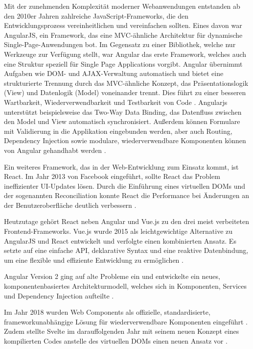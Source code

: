 \documentclass[oneside]{ausarbeitung}
\begin{document}
Mit der zunehmenden Komplexität moderner Webanwendungen entstanden ab den 2010er Jahren zahlreiche JavaScript-Frameworks, die den Entwicklungsprozess vereinheitlichen und vereinfachen sollten. 
Eines davon war AngularJS, ein Framework, das eine \ac{MVC}-ähnliche Architektur für dynamische Single-Page-Anwendungen bot. Im Gegensatz zu einer Bibliothek, welche nur Werkzeuge zur Verfügung stellt, war Angular das erste Framework, welches auch eine Struktur speziell für Single Page Applications vorgibt. Angular übernimmt Aufgaben wie DOM- und \ac{AJAX}-Verwaltung automatisch und bietet eine strukturierte Trennung durch das \ac{MVC}-ähnliche Konzept, das Präsentationslogik (View) und Datenlogik (Model) voneinander trennt. Dies führt zu einer besseren Wartbarkeit, Wiederverwendbarkeit und Testbarkeit von Code \parencite{what-is-angularjs}. Angularjs unterstützt beispielsweise das Two-Way Data Binding, das Datenfluss zwischen den Model und View automatisch synchronisiert. Außerdem können Formulare mit Validierung in die Applikation eingebunden werden, aber auch Routing, Dependency Injection sowie modulare, wiederverwendbare Komponenten können von Angular gehandhabt werden \parencite{angular-history}. 


Ein weiteres Framework, das in der Web-Entwicklung zum Einsatz kommt, ist React. Im Jahr 2013 von Facebook eingeführt, sollte React das Problem ineffizienter \ac{UI}-Updates lösen. Durch die Einführung eines virtuellen DOMs und der sogenannten Reconciliation konnte React die Performance bei Änderungen an der Benutzeroberfläche deutlich verbessern \parencite{hunt2013react}.

Heutzutage gehört React neben Angular und Vue.js zu den drei meist verbeiteten Frontend-Frameworks. Vue.js wurde 2015 als leichtgewichtige Alternative zu AngularJS und React entwickelt und verfolgte einen kombinierten Ansatz. 
Es setzte auf eine einfache API, deklarative Syntax und eine reaktive Datenbindung, um eine flexible und effiziente Entwicklung zu ermöglichen \parencite{vue-intro}. 

Angular Version 2 ging auf alte Probleme ein und entwickelte ein neues, komponentenbasiertes Architekturmodell, welches sich in Komponenten, Services und Dependency Injection aufteilte \parencite{angular-docs}. 

Im Jahr 2018 wurden Web Components als offizielle, standardisierte, frameworkunabhängige Lösung für wiederverwendbare Komponenten eingeführt \parencite{mdn-webcomponents}. 
Zudem stellte Svelte im darauffolgenden Jahr mit seinem neuen Konzept eines kompilierten Codes anstelle des virtuellen DOMs einen neuen Ansatz vor \parencite{svelte-intro}.
\end{document}
